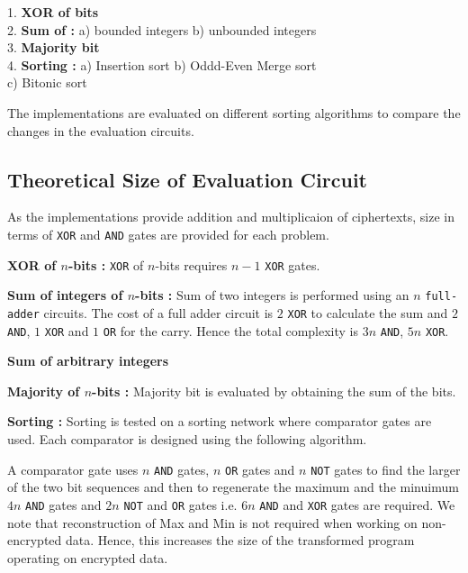 \documentclass{acm_proc_article-sp}
\begin{document}
1. \textbf{XOR of bits}\\
2. \textbf{Sum of :}  
\newline\noindent
\phantom{x}\hspace{3ex} a) bounded integers 
 b) unbounded integers\\ 
3. \textbf{Majority bit} \\
4. \textbf{Sorting : } \newline\noindent
\phantom{x}\hspace{3ex} a) Insertion sort b) Oddd-Even Merge sort \\
	\phantom{x}\hspace{3ex} 	    c) Bitonic sort 

The implementations are evaluated on different sorting algorithms to compare the changes in the evaluation circuits.

\subsection{Theoretical Size of Evaluation Circuit}
As the implementations provide addition and multiplicaion of ciphertexts,  size in terms of \texttt{XOR} and \texttt{AND} gates are provided for each problem. 

\textbf{XOR of $n$-bits :} \texttt{XOR} of $n$-bits requires $n-1$ \texttt{XOR} gates. 

\textbf{Sum of integers of $n$-bits :} Sum of two integers is performed using an $n$ \texttt{full-adder} circuits. The cost of a full adder circuit is $2$ \texttt{XOR} to calculate the sum and $2$ \texttt{AND}, $1$ \texttt{XOR} and $1$ \texttt{OR} for the carry. Hence the total complexity is $3n$ \texttt{AND}, $5n$ \texttt{XOR}. 

\textbf{Sum of arbitrary integers}

\textbf{Majority of $n$-bits :} Majority bit is evaluated by obtaining the sum of the bits.

\textbf{Sorting :}
Sorting is tested on a sorting network where comparator gates are used. Each comparator is designed using the following algorithm. 




A comparator gate uses $n$ \texttt{AND} gates, $n$ \texttt{OR} gates and $n$ \texttt{NOT} gates to find the larger of the two bit sequences and then to regenerate the maximum and the minuimum $4n$ \texttt{AND} gates and $2n$ \texttt{NOT} and \texttt{OR} gates i.e. $6n$ \texttt{AND} and \texttt{XOR} gates are required. We note that reconstruction of Max and  Min is not required when working on non-encrypted data. Hence, this increases the size of the transformed program operating on encrypted data.
\end{document}
